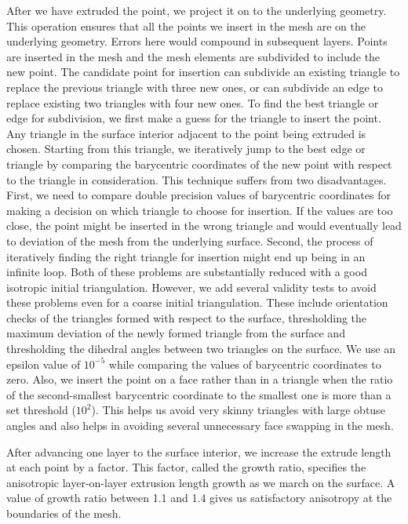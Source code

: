 After we have extruded the point, we project it on to the underlying geometry. This operation ensures that all the  points we insert in the mesh are on the underlying geometry. Errors here would compound in subsequent layers. Points are inserted in the mesh and the mesh elements are subdivided to include the new point. The candidate point for insertion can subdivide an existing triangle to replace the previous triangle with three new ones, or can subdivide an edge to replace existing two triangles with four new ones. To find the best triangle or edge for subdivision, we first make a guess for the triangle to insert the point. Any triangle in the surface interior adjacent to the point being extruded is chosen. Starting from this triangle, we iteratively jump to the best edge or triangle by comparing the barycentric coordinates of the new point with respect to the triangle in consideration. This technique suffers from two disadvantages. First, we need to compare double precision values of barycentric coordinates for making a decision on which triangle to choose for insertion. If the values are too close, the point might be inserted in the wrong triangle and would eventually lead to deviation of the mesh from the underlying surface. Second, the process of iteratively finding the right triangle for insertion might end up being in an infinite loop. Both of these problems are substantially reduced with a good isotropic initial triangulation. However, we add several validity tests to avoid these problems even for a coarse initial triangulation. These include orientation checks of the triangles formed with respect to the surface, thresholding the maximum deviation of the newly formed triangle from the surface and thresholding the dihedral angles between two triangles on the surface. We use an epsilon value of $10^{-5}$ while comparing the values of barycentric coordinates to zero. Also, we insert the point on a face rather than in a triangle when the ratio of the second-smallest barycentric coordinate to the smallest one is more than a set threshold ($10^2$). This helps us avoid very skinny triangles with large obtuse angles and also helps in avoiding several unnecessary face swapping in the mesh.

After advancing one layer to the surface interior, we increase the extrude length at each point by a factor. This factor, called the growth ratio, specifies the anisotropic layer-on-layer extrusion length growth as we march on the surface. A value of growth ratio between 1.1 and 1.4 gives us satisfactory anisotropy at the boundaries of the mesh.

